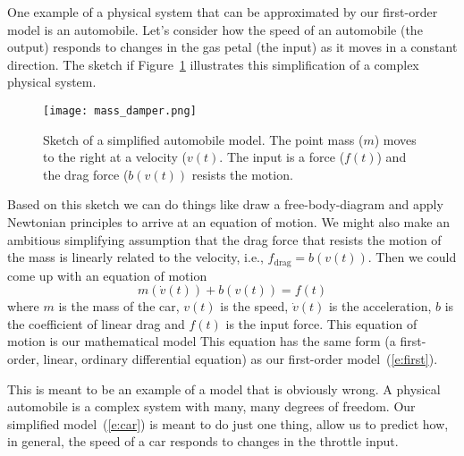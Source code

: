 One example of a physical system that can be approximated by our first-order model is an automobile.  Let's consider how the speed of an automobile (the output) responds to changes in the gas petal (the input) as it moves in a constant direction.  The sketch if Figure~\ref{f:massd} illustrates this simplification of a complex physical system. 
\begin{figure}[hbt!]
\centering
\texttt{[image: mass\_damper.png]}
\caption{Sketch of a simplified automobile model.  The point mass ($m$) moves to the right at a velocity ($v(t)$.  The input is a force ($f(t)$) and the drag force ($b (v(t))$ resists the motion. }
\label{f:massd}
\end{figure}
Based on this sketch we can do things like draw a free-body-diagram and apply Newtonian principles to arrive at an equation of motion.  We might also make an ambitious simplifying assumption that the drag force that resists the motion of the mass is linearly related to the velocity, i.e., $f_{\mathrm{drag}}=b(v(t))$.  Then we could come up with an equation of motion
\begin{equation}
\label{e:car}
m\left(\dot{v}(t)\right) + b(v(t)) = f(t)
\end{equation}
where $m$ is the mass of the car, $v(t)$ is the speed, $\dot{v}(t)$ is the acceleration, $b$ is the coefficient of linear drag and $f(t)$ is the input force.  This equation of motion is our mathematical model
This equation has the same form (a first-order, linear, ordinary differential equation) as our first-order model~(\ref{e:first}).

This is meant to be an example of a model that is obviously wrong.  A physical automobile is a complex system with many, many degrees of freedom.  Our simplified model~(\ref{e:car}) is meant to do just one thing, allow us to predict how, in general, the speed of a car responds to changes in the throttle input.
